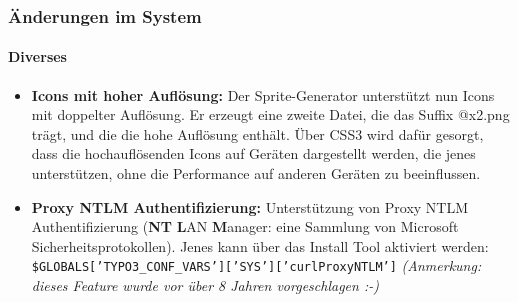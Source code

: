 \begin{frame}[fragile]
	\frametitle{Änderungen im System}
	\framesubtitle{Diverses}

	\begin{itemize}

		\item \textbf{Icons mit hoher Auflösung:}\newline
			\small
				Der Sprite-Generator unterstützt nun Icons mit doppelter Auflösung. Er erzeugt eine zweite Datei, die das Suffix @x2.png trägt, und die die hohe Auflösung enthält.
				Über CSS3 wird dafür gesorgt, dass die hochauflösenden Icons auf Geräten dargestellt werden, die jenes unterstützen, ohne die Performance auf anderen Geräten zu beeinflussen.
			\normalsize

		\item \textbf{Proxy NTLM Authentifizierung:}\newline
			\small
				Unterstützung von Proxy NTLM Authentifizierung (\textbf{NT} \textbf{L}AN \textbf{M}anager: eine Sammlung von Microsoft Sicherheitsprotokollen).
				Jenes kann über das Install Tool aktiviert werden:
			\normalsize
			\smaller
				\texttt{\$GLOBALS['TYPO3\_CONF\_VARS']['SYS']['curlProxyNTLM']}\newline
				\emph{(Anmerkung: dieses Feature wurde vor über 8 Jahren vorgeschlagen :-)}
			\normalsize

	\end{itemize}
	
\end{frame}



